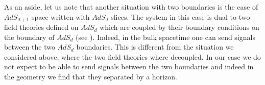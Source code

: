 



As an aside, let us note that 
another situation with two boundaries is the case of $AdS_{d+1}$ space 
written with $AdS_{d}$ slices. The system in this case is dual to 
two field 
theories defined on 
 $AdS_{d}$ which are coupled by their boundary conditions
on the boundary of $AdS_{d}$ (see \karch ). 
 Indeed, in the bulk spacetime one can send 
signals between the two $AdS_d$ boundaries.  
This is different from the situation we
considered above, where the two field theories where decoupled. 
In our  case we do not expect to be able to send signals between the
two boundaries and indeed in the geometry we find that they separated
by a horizon.
 
